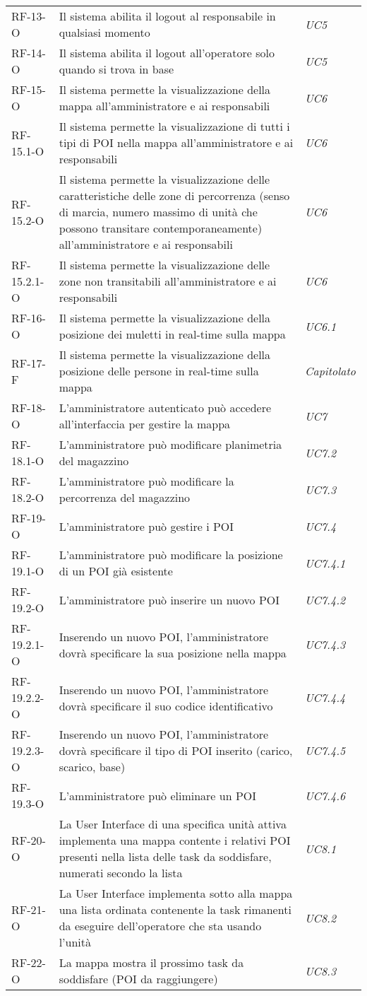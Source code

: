 \begin{longtable}{ 
		>{\centering}p{} 
		>{}p{}
		>{\centering \it}p{} }
RF-13-O & Il sistema abilita il logout al responsabile in qualsiasi momento & UC5\tabularnewline
RF-14-O & Il sistema abilita il logout all'operatore solo quando si trova in base & UC5\tabularnewline
RF-15-O & Il sistema permette la visualizzazione della mappa all’amministratore e ai responsabili & UC6\tabularnewline
RF-15.1-O & Il sistema permette la visualizzazione di tutti i tipi di POI nella mappa all’amministratore e ai responsabili & UC6\tabularnewline
RF-15.2-O & Il sistema permette la visualizzazione delle caratteristiche delle zone di percorrenza (senso di marcia, numero massimo di unità che possono transitare contemporaneamente) all’amministratore e ai responsabili & UC6\tabularnewline
RF-15.2.1-O & Il sistema permette la visualizzazione delle zone non transitabili all’amministratore e ai responsabili & UC6\tabularnewline
RF-16-O & Il sistema permette la visualizzazione della posizione dei muletti in real-time sulla mappa & UC6.1\tabularnewline
RF-17-F & Il sistema permette la visualizzazione della posizione delle persone in real-time sulla mappa & Capitolato\tabularnewline
RF-18-O & L’amministratore autenticato può accedere all’interfaccia per gestire la mappa  & UC7\tabularnewline
RF-18.1-O & L’amministratore può modificare planimetria del magazzino & UC7.2\tabularnewline
RF-18.2-O & L’amministratore può modificare la percorrenza del magazzino & UC7.3\tabularnewline
RF-19-O & L’amministratore può gestire i POI & UC7.4\tabularnewline
RF-19.1-O & L'amministratore può modificare la posizione di un POI già esistente & UC7.4.1\tabularnewline
RF-19.2-O & L'amministratore può inserire un nuovo POI & UC7.4.2\tabularnewline
RF-19.2.1-O & Inserendo un nuovo POI, l'amministratore dovrà specificare la sua posizione nella mappa & UC7.4.3\tabularnewline
RF-19.2.2-O & Inserendo un nuovo POI, l'amministratore dovrà specificare il suo codice identificativo & UC7.4.4\tabularnewline
RF-19.2.3-O & Inserendo un nuovo POI, l'amministratore dovrà specificare il tipo di POI inserito (carico, scarico, base) & UC7.4.5\tabularnewline
RF-19.3-O & L'amministratore può eliminare un POI & UC7.4.6\tabularnewline
RF-20-O & La User Interface di una specifica unità attiva implementa una mappa contente i relativi POI presenti nella lista delle task da soddisfare, numerati secondo la lista & UC8.1\tabularnewline
RF-21-O & La User Interface implementa sotto alla mappa una lista ordinata contenente la task rimanenti da eseguire dell’operatore che sta usando l’unità & UC8.2\tabularnewline
RF-22-O & La mappa mostra il prossimo task da soddisfare (POI da raggiungere) & UC8.3\tabularnewline

\end{longtable}
